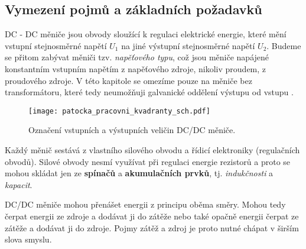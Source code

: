 {    %
      

    \subsection{Vymezení pojmů a základních požadavků}\label{aes:sec012}
      DC - DC měniče jsou obvody sloužící k regulaci elektrické energie, které mění vstupní
      stejnosměrné napětí \(U_1\) na jiné výstupní stejnosměrné napětí \(U_2\). Budeme se přitom 
      zabývat měniči tzv. \emph{napěťového typu}, což jsou měniče napájené konstantním vstupním 
      napětím z napěťového zdroje, nikoliv proudem, z proudového zdroje. V této kapitole se omezíme 
      pouze na měniče bez transformátoru, které tedy neumožňuji galvanické oddělení výstupu od 
      vstupu \cite{Patocka}.
      
      \begin{figure}[ht!]
        \centering
        \texttt{[image: patocka\_pracovni\_kvadranty\_sch.pdf]}
        \caption{Označení vstupních a výstupních veličin DC/DC měniče.}
        \label{enz:fig_005}
      \end{figure}
      
      Každý měnič sestává z vlastního silového obvodu a řídicí elektroniky (regulačních obvodů).
      Silové obvody nesmí využívat při regulaci energie rezistorů a proto se mohou skládat jen ze
      \textbf{spínačů} a \textbf{akumulačních prvků}, tj. \emph{indukčnosti} a \emph{kapacit}.
      
      DC/DC měniče mohou přenášet energii z principu oběma směry. Mohou tedy čerpat energii ze
      zdroje a dodávat ji do zátěže nebo také opačně energii čerpat ze zátěže a dodávat ji do
      zdroje. Pojmy zátěž a zdroj je proto nutné chápat v širším slova smyslu.
      
}
